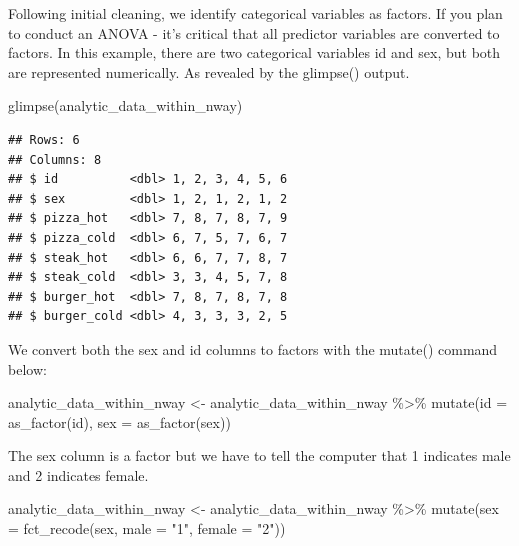 \documentclass[
]{krantz}
\makeatletter
\newenvironment{Shaded}{\begin{snugshade}}{\end{snugshade}}
\newcommand{\AttributeTok}[1]{\textcolor[rgb]{0.61,0.61,0.61}{#1}}
\newcommand{\FunctionTok}[1]{\textcolor[rgb]{0,0,0}{#1}}
\newcommand{\NormalTok}[1]{#1}
\newcommand{\OtherTok}[1]{\textcolor[rgb]{0.37,0.37,0.37}{#1}}
\newcommand{\SpecialCharTok}[1]{\textcolor[rgb]{0,0,0}{#1}}
\newcommand{\StringTok}[1]{\textcolor[rgb]{0.5,0.5,0.5}{#1}}
\newenvironment{kframe}{%
\medskip{}
\setlength{\fboxsep}{.8em}
 \def\at@end@of@kframe{}%
 \ifinner\ifhmode%
  \def\at@end@of@kframe{\end{minipage}}%
  \begin{minipage}{\columnwidth}%
 \fi\fi%
 \def\FrameCommand##1{\hskip\@totalleftmargin \hskip-\fboxsep
 \colorbox{shadecolor}{##1}\hskip-\fboxsep
     \hskip-\linewidth \hskip-\@totalleftmargin \hskip\columnwidth}%
 \MakeFramed {\advance\hsize-\width
   \@totalleftmargin\z@ \linewidth\hsize
   \@setminipage}}%
 {\par\unskip\endMakeFramed%
 \at@end@of@kframe}
\renewenvironment{Shaded}{\begin{kframe}}{\end{kframe}}
\makeatother
\begin{document}
Following initial cleaning, we identify categorical variables as factors. If you plan to conduct an ANOVA - it's critical that all predictor variables are converted to factors. In this example, there are two categorical variables id and sex, but both are represented numerically. As revealed by the glimpse() output.

\begin{Shaded}
\begin{Highlighting}[]
\FunctionTok{glimpse}\NormalTok{(analytic\_data\_within\_nway)}
\end{Highlighting}
\end{Shaded}

\begin{verbatim}
## Rows: 6
## Columns: 8
## $ id          <dbl> 1, 2, 3, 4, 5, 6
## $ sex         <dbl> 1, 2, 1, 2, 1, 2
## $ pizza_hot   <dbl> 7, 8, 7, 8, 7, 9
## $ pizza_cold  <dbl> 6, 7, 5, 7, 6, 7
## $ steak_hot   <dbl> 6, 6, 7, 7, 8, 7
## $ steak_cold  <dbl> 3, 3, 4, 5, 7, 8
## $ burger_hot  <dbl> 7, 8, 7, 8, 7, 8
## $ burger_cold <dbl> 4, 3, 3, 3, 2, 5
\end{verbatim}

We convert both the sex and id columns to factors with the mutate() command below:

\begin{Shaded}
\begin{Highlighting}[]
\NormalTok{analytic\_data\_within\_nway }\OtherTok{\textless{}{-}}\NormalTok{ analytic\_data\_within\_nway }\SpecialCharTok{\%\textgreater{}\%}
  \FunctionTok{mutate}\NormalTok{(}\AttributeTok{id =} \FunctionTok{as\_factor}\NormalTok{(id),}
         \AttributeTok{sex =} \FunctionTok{as\_factor}\NormalTok{(sex))}
\end{Highlighting}
\end{Shaded}

The sex column is a factor but we have to tell the computer that 1 indicates male and 2 indicates female.

\begin{Shaded}
\begin{Highlighting}[]
\NormalTok{analytic\_data\_within\_nway }\OtherTok{\textless{}{-}}\NormalTok{ analytic\_data\_within\_nway }\SpecialCharTok{\%\textgreater{}\%}
  \FunctionTok{mutate}\NormalTok{(}\AttributeTok{sex =} \FunctionTok{fct\_recode}\NormalTok{(sex,}
                          \AttributeTok{male =} \StringTok{"1"}\NormalTok{,}
                          \AttributeTok{female =} \StringTok{"2"}\NormalTok{))}
\end{Highlighting}
\end{Shaded}
\end{document}
